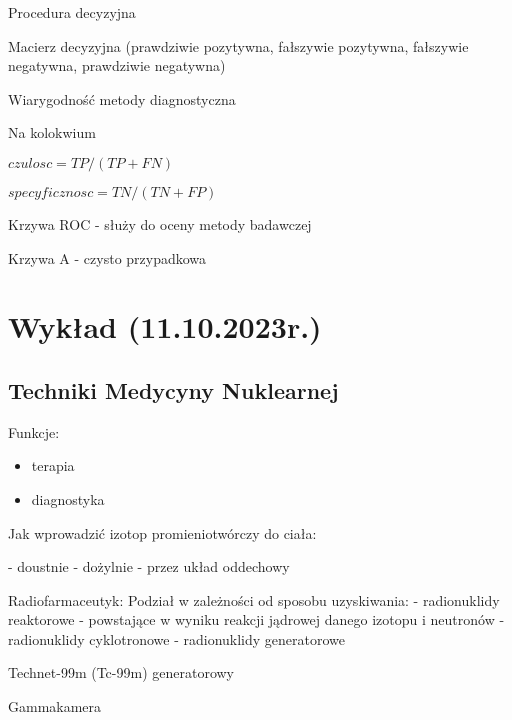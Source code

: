 \documentclass{article}
\begin{document}
Procedura decyzyjna

Macierz decyzyjna (prawdziwie pozytywna, fałszywie pozytywna, fałszywie negatywna, prawdziwie negatywna)

Wiarygodność metody diagnostyczna

Na kolokwium

$czulosc = TP/(TP+FN)$

$specyficznosc = TN/(TN+FP)$

Krzywa ROC - służy do oceny metody badawczej

Krzywa A - czysto przypadkowa

\section{Wykład (11.10.2023r.)}

\subsection{Techniki Medycyny Nuklearnej}

Funkcje:
\begin{itemize}
    \item terapia
    \item diagnostyka
\end{itemize}

Jak wprowadzić izotop promieniotwórczy do ciała:

- doustnie
- dożylnie
- przez układ oddechowy

Radiofarmaceutyk:
Podział w zależności od sposobu uzyskiwania:
- radionuklidy reaktorowe - powstające w wyniku reakcji jądrowej danego izotopu i neutronów
- radionuklidy cyklotronowe 
- radionuklidy generatorowe

Technet-99m (Tc-99m) generatorowy

Gammakamera
\end{document}
